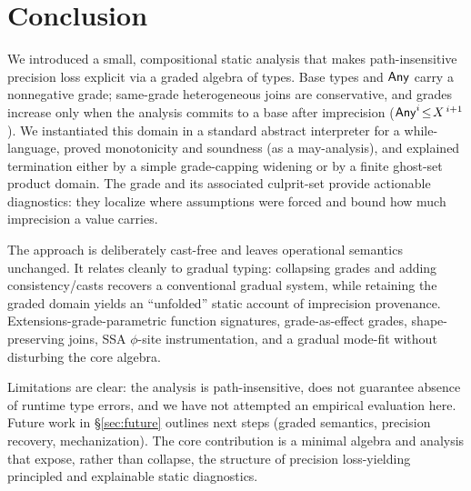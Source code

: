 \section{Conclusion}
\label{sec:conclusion}

We introduced a small, compositional static analysis that makes path-insensitive precision loss explicit via a graded algebra of types. Base types and $\mathsf{Any}$ carry a nonnegative grade; same-grade heterogeneous joins are conservative, and grades increase only when the analysis commits to a base after imprecision ($\mathsf{Any}^{i}\!\le\!X^{\,i+1}$). We instantiated this domain in a standard abstract interpreter for a \textsf{while}-language, proved monotonicity and soundness (as a may-analysis), and explained termination either by a simple grade-capping widening or by a finite ghost-set product domain. The grade and its associated culprit-set provide actionable diagnostics: they localize where assumptions were forced and bound how much imprecision a value carries.

The approach is deliberately cast-free and leaves operational semantics unchanged. It relates cleanly to gradual typing: collapsing grades and adding consistency/casts recovers a conventional gradual system, while retaining the graded domain yields an ``unfolded'' static account of imprecision provenance. Extensions-grade-parametric function signatures, grade-as-effect grades, shape-preserving joins, SSA $\phi$-site instrumentation, and a gradual mode-fit without disturbing the core algebra.

Limitations are clear: the analysis is path-insensitive, does not guarantee absence of runtime type errors, and we have not attempted an empirical evaluation here. Future work in \S\ref{sec:future} outlines next steps (graded semantics, precision recovery, mechanization). The core contribution is a minimal algebra and analysis that expose, rather than collapse, the structure of precision loss-yielding principled and explainable static diagnostics.
